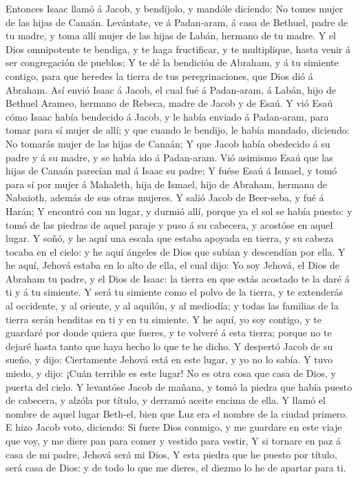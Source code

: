  Entonces Isaac llamó á Jacob, y bendíjolo, y mandóle
diciendo: No tomes mujer de las hijas de Canaán. 
Levántate, ve á Padan-aram, á casa de Bethuel, padre de tu madre, y toma
allí mujer de las hijas de Labán, hermano de tu madre.  Y
el Dios omnipotente te bendiga, y te haga fructificar, y te multiplique,
hasta venir á ser congregación de pueblos;  Y te dé la
bendición de Abraham, y á tu simiente contigo, para que heredes la
tierra de tus peregrinaciones, que Dios dió á Abraham. 
Así envió Isaac á Jacob, el cual fué á Padan-aram, á Labán, hijo de
Bethuel Arameo, hermano de Rebeca, madre de Jacob y de Esaú.
 Y vió Esaú cómo Isaac había bendecido á Jacob, y le había
enviado á Padan-aram, para tomar para sí mujer de allí; y que cuando le
bendijo, le había mandado, diciendo: No tomarás mujer de las hijas de
Canaán;  Y que Jacob había obedecido á su padre y á su
madre, y se había ido á Padan-aram.  Vió asimismo Esaú que
las hijas de Canaán parecían mal á Isaac su padre;  Y
fuése Esaú á Ismael, y tomó para sí por mujer á Mahaleth, hija de
Ismael, hijo de Abraham, hermana de Nabaioth, además de sus otras
mujeres.  Y salió Jacob de Beer-seba, y fué á Harán;
 Y encontró con un lugar, y durmió allí, porque ya el sol
se había puesto: y tomó de las piedras de aquel paraje y puso á su
cabecera, y acostóse en aquel lugar.  Y soñó, y he aquí
una escala que estaba apoyada en tierra, y su cabeza tocaba en el cielo:
y he aquí ángeles de Dios que subían y descendían por ella.
 Y he aquí, Jehová estaba en lo alto de ella, el cual
dijo: Yo soy Jehová, el Dios de Abraham tu padre, y el Dios de Isaac: la
tierra en que estás acostado te la daré á ti y á tu simiente.
 Y será tu simiente como el polvo de la tierra, y te
extenderás al occidente, y al oriente, y al aquilón, y al mediodía; y
todas las familias de la tierra serán benditas en ti y en tu simiente.
 Y he aquí, yo soy contigo, y te guardaré por donde
quiera que fueres, y te volveré á esta tierra; porque no te dejaré hasta
tanto que haya hecho lo que te he dicho.  Y despertó
Jacob de su sueño, y dijo: Ciertamente Jehová está en este lugar, y yo
no lo sabía.  Y tuvo miedo, y dijo: ¡Cuán terrible es
este lugar! No es otra cosa que casa de Dios, y puerta del cielo.
 Y levantóse Jacob de mañana, y tomó la piedra que había
puesto de cabecera, y alzóla por título, y derramó aceite encima de
ella.  Y llamó el nombre de aquel lugar Beth-el, bien que
Luz era el nombre de la ciudad primero.  E hizo Jacob
voto, diciendo: Si fuere Dios conmigo, y me guardare en este viaje que
voy, y me diere pan para comer y vestido para vestir,  Y
si tornare en paz á casa de mi padre, Jehová será mi Dios,
 Y esta piedra que he puesto por título, será casa de
Dios: y de todo lo que me dieres, el diezmo lo he de apartar para ti.

